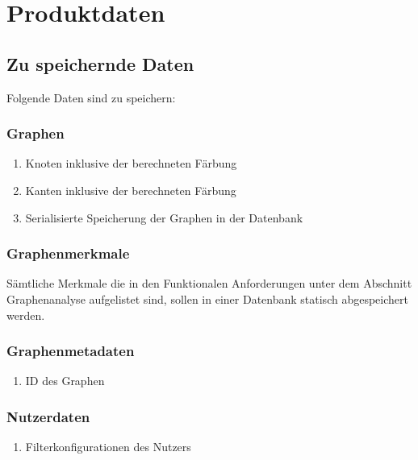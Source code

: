\documentclass[13pt]{scrreprt}
\begin{document}
\chapter{Produktdaten}

\section{Zu speichernde Daten}
Folgende Daten sind zu speichern:

\subsection{Graphen}
\begin{addmargin}[25pt]{0pt}
\begin{enumerate} [label=D\arabic*,start=100]
	\item Knoten inklusive der berechneten Färbung
	\item Kanten inklusive der berechneten Färbung
	\item Serialisierte Speicherung der Graphen in der Datenbank
\end{enumerate}
\end{addmargin}

\subsection{Graphenmerkmale}
\begin{addmargin}[25pt]{0pt}
	Sämtliche Merkmale die in den Funktionalen Anforderungen unter dem Abschnitt Graphenanalyse aufgelistet sind, sollen in einer Datenbank statisch abgespeichert werden.
\end{addmargin}

\subsection{Graphenmetadaten}
\begin{addmargin}[25pt]{0pt}
\begin{enumerate} [label=D\arabic*,start=300]
	\item ID des Graphen
\end{enumerate}
\end{addmargin}

\subsection{Nutzerdaten}
\begin{addmargin}[25pt]{0pt}
\begin{enumerate} [label=D\arabic*,start=400]
	\item Filterkonfigurationen des Nutzers
\end{enumerate}
\end{addmargin}
\end{document}
